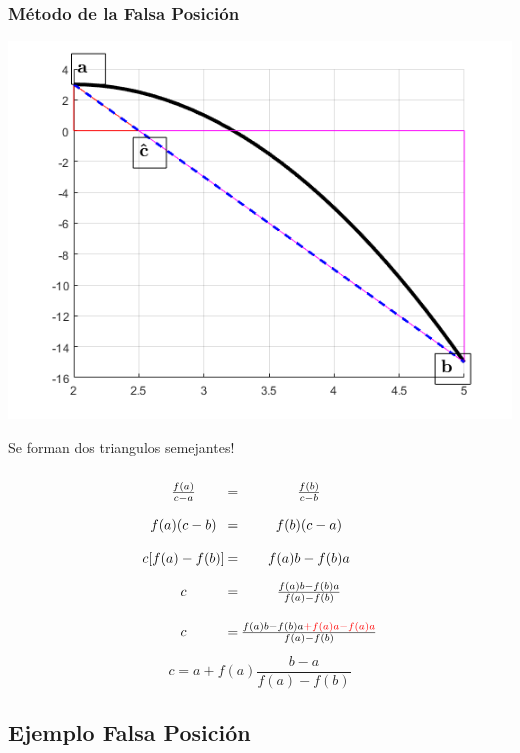 \documentclass[xcolor=svgnames]{beamer} %
\theoremstyle{plain}
\theoremstyle{definition}
\begin{document}
\begin{frame}
\frametitle{Método de la Falsa Posición}

\begin{minipage}{.45\linewidth}
\includegraphics[scale=.35]{FalsaPosicion/triangulosSemejantes.png} 

Se forman dos triangulos semejantes!

\end{minipage} \begin{minipage}{.45\linewidth}

\[\arraycolsep=1pt\def\arraystretch{2}
\begin{array}{ccc}
\frac{f(a)}{c-a} & = & \frac{f(b)}{c-b} \\
f(a)(c-b) & = & f(b)(c-a)\\
c [f(a)-f(b)] & = & f(a)b - f(b)a \\\vspace{5pt}
c & = & \frac{f(a)b-f(b)a}{f(a)-f(b)}\\
c & = & \frac{ f(a)b-f(b)a {\color{red} +f(a)a-f(a)a }  }{ f(a)-f(b) }\\
\end{array}
\]
$$ \boxed{ c  = a + f(a)\frac{b-a}{f(a)-f(b)} } $$


\end{minipage}
\end{frame}





\subsection{Ejemplo Falsa Posición}
\end{document}
